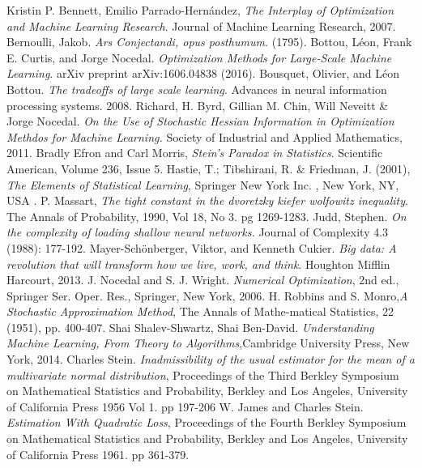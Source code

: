 \documentclass{book}
\theoremstyle{plain}
\theoremstyle{definition}
\theoremstyle{remark}
\begin{document}
\begin{thebibliography}{9}
 Kristin P. Bennett, Emilio Parrado-Hernández, \emph{The Interplay of Optimization and Machine Learning Research}. Journal of Machine Learning Research, 2007.
Bernoulli, Jakob. \emph{Ars Conjectandi, opus posthumum.} (1795).
  Bottou, Léon, Frank E. Curtis, and Jorge Nocedal. \emph{Optimization Methods for Large-Scale Machine Learning}. arXiv preprint arXiv:1606.04838 (2016).
Bousquet, Olivier, and Léon Bottou. \emph{The tradeoffs of large scale learning}. Advances in neural information processing systems. 2008.
 Richard, H. Byrd, Gillian M. Chin, Will Neveitt \& Jorge Nocedal.
  \emph{On the Use of Stochastic Hessian Information in Optimization Methdos for Machine Learning.} Society of Industrial and Applied Mathematics, 2011.
 Bradly Efron and Carl Morris, \emph{Stein's Paradox in Statistics}. Scientific American, Volume 236, Issue 5.
 Hastie, T.; Tibshirani, R. \& Friedman, J. (2001), \emph{The Elements of Statistical Learning}, Springer New York Inc. , New York, NY, USA .
 P. Massart, \emph{The tight constant in the dvoretzky kiefer wolfowitz inequality}. The Annals of Probability, 1990, Vol 18, No 3. pg 1269-1283. 
Judd, Stephen. \emph{On the complexity of loading shallow neural networks.} Journal of Complexity 4.3 (1988): 177-192.
 Mayer-Schönberger, Viktor, and Kenneth Cukier. \emph{Big data: A revolution that will transform how we live, work, and think}. Houghton Mifflin Harcourt, 2013.
 J. Nocedal and S. J. Wright. \emph{Numerical Optimization}, 2nd ed., Springer Ser. Oper. Res., Springer, New York, 2006.
H. Robbins and S. Monro,\emph{A  Stochastic  Approximation  Method}, The Annals of Mathe-matical Statistics, 22 (1951), pp. 400-407.
 Shai Shalev-Shwartz, Shai Ben-David. \emph{Understanding Machine Learning, From Theory to Algorithms},Cambridge University Press, New York, 2014.
 Charles Stein. \emph{Inadmissibility of the usual estimator for the mean of a multivariate normal distribution}, Proceedings of the Third Berkley Symposium on Mathematical Statistics and Probability, Berkley and Los Angeles, University of California Press 1956 Vol 1. pp 197-206
 W. James and Charles Stein. \emph{Estimation With Quadratic Loss},  Proceedings of the Fourth Berkley Symposium on Mathematical Statistics and Probability, Berkley and Los Angeles, University of California Press 1961. pp 361-379.

\end{thebibliography}
\end{document}
